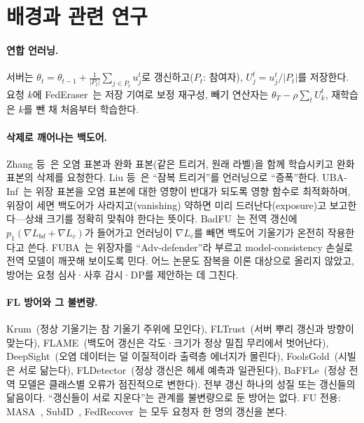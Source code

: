 \documentclass[10pt,a4paper]{article}
\begin{document}
\section{배경과 관련 연구}
\paragraph{연합 언러닝.}
서버는 $\theta_t=\theta_{t-1}+\frac{1}{|P_t|}\sum_{j\in P_t}u_j^t$로 갱신하고($P_t$: 참여자), $U_j^t=u_j^t/|P_t|$를 저장한다. 요청 $k$에 FedEraser~\cite{federaser}는 저장 기여로 보정 재구성, 빼기 연산자는 $\theta_T-\rho\sum_t U_k^t$, 재학습은 $k$를 뺀 채 처음부터 학습한다.

\paragraph{삭제로 깨어나는 백도어.}
Zhang 등~\cite{zhang2023}은 오염 표본과 완화 표본(같은 트리거, 원래 라벨)을 함께 학습시키고 완화 표본의 삭제를 요청한다. Liu 등~\cite{liu2024}은 ``잠복 트리거''를 언러닝으로 ``증폭''한다. UBA-Inf~\cite{ubainf}는 위장 표본을 오염 표본에 대한 영향이 반대가 되도록 영향 함수로 최적화하며, 위장이 세면 백도어가 사라지고(vanishing) 약하면 미리 드러난다(exposure)고 보고한다---상쇄 크기를 정확히 맞춰야 한다는 뜻이다. BadFU~\cite{badfu}는 전역 갱신에 $p_1(\nabla L_{bd}+\nabla L_c)$가 들어가고 언러닝이 $\nabla L_c$를 빼면 백도어 기울기가 온전히 작용한다고 쓴다. FUBA~\cite{fuba}는 위장자를 ``Adv-defender''라 부르고 model-consistency 손실로 전역 모델이 깨끗해 보이도록 민다. 어느 논문도 잠복을 이론 대상으로 올리지 않았고, 방어는 요청 심사·사후 감시·DP를 제안하는 데 그친다.

\paragraph{FL 방어와 그 불변량.}
Krum~\cite{krum}(정상 기울기는 참 기울기 주위에 모인다), FLTrust~\cite{fltrust}(서버 뿌리 갱신과 방향이 맞는다), FLAME~\cite{flame}(백도어 갱신은 각도·크기가 정상 밀집 무리에서 벗어난다), DeepSight~\cite{deepsight}(오염 데이터는 덜 이질적이라 출력층 에너지가 몰린다), FoolsGold~\cite{foolsgold}(시빌은 서로 닮는다), FLDetector~\cite{fldetector}(정상 갱신은 헤세 예측과 일관된다), BaFFLe~\cite{baffle}(정상 전역 모델은 클래스별 오류가 점진적으로 변한다). 전부 갱신 하나의 성질 또는 갱신들의 닮음이다. ``갱신들이 서로 지운다''는 관계를 불변량으로 둔 방어는 없다. FU 전용: MASA~\cite{masa}, SubID~\cite{subid}, FedRecover~\cite{fedrecover}는 모두 요청자 한 명의 갱신을 본다.
\end{document}
